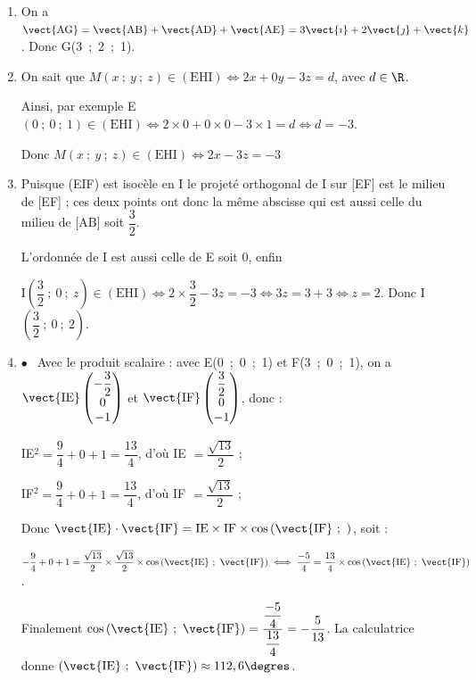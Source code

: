 \begin{enumerate}
\item 
On a $\vect{\text{AG}} = \vect{\text{AB}} + \vect{\text{AD}} + \vect{\text{AE}} = 3\vect{\imath} + 2\vect{\jmath} + \vect{k}$. Donc G(3~;~2~;~1).
\item 


On sait que $M(x~;~y~;~z) \in (\text{EHI}) \iff 2x + 0y - 3z = d$, avec $d \in \R$.

Ainsi, par exemple  E$(0~;~0~;~1) \in (\text{EHI}) \iff 2\times 0 + 0\times 0 - 3\times 1 = d \iff d = -3$.

Donc $M(x~;~y~;~z) \in (\text{EHI}) \iff 2x  - 3z = -3$
\item 
Puisque (EIF) est isocèle en I le projeté orthogonal de I sur [EF] est le milieu de [EF] ; ces deux points ont donc la même abscisse qui est aussi celle du milieu de [AB] soit $\dfrac32$.

L'ordonnée de I est aussi celle de E soit $0$, enfin 

I$\left(\dfrac32~;~0~;~z\right) \in (\text{EHI}) \iff 2 \times \dfrac32  - 3z = - 3\iff 3z = 3 + 3 \iff z = 2$. Donc I$\left(\dfrac32~;~0~;~2\right)$.
\item 
$\bullet~~$ Avec le produit scalaire : avec E(0~;~0~;~1) et F(3~;~0~;~1), on a $\vect{\text{IE}}\begin{pmatrix}-\dfrac32\\0\\- 1\end{pmatrix}$ et $\vect{\text{IF}}\begin{pmatrix}\dfrac32\\0\\- 1\end{pmatrix}$, donc :

IE$^2 = \dfrac94 + 0 + 1 = \dfrac{13}{4}$, d'où IE $ = \dfrac{\sqrt{13}}{2}$ ;

IF$^2 = \dfrac94 + 0 + 1 = \dfrac{13}{4}$, d'où IF $ = \dfrac{\sqrt{13}}{2}$ ;

Donc $\vect{\text{IE}} \cdot \vect{\text{IF}} = \text{IE} \times \text{IF} \times \cos \left(\vect{\text{IF}}~;~ \right)$, soit :

$- \dfrac94 + 0 + 1 = \dfrac{\sqrt{13}}{2} \times \dfrac{\sqrt{13}}{2} \times \cos \left(\vect{\text{IE}}~;~ \vect{\text{IF}}\right) \iff \dfrac{-5}{4} = \dfrac{13}{4}\times \cos \left(\vect{\text{IE}}~;~ \vect{\text{IF}}\right) $.

Finalement $\cos \left(\vect{\text{IE}}~;~ \vect{\text{IF}}\right) = \dfrac{\dfrac{-5}{4}}{\dfrac{13}{4}} = - \dfrac{5}{13}$. La calculatrice donne $\left(\vect{\text{IE}}~;~ \vect{\text{IF}}\right) \approx 112,6\degres$.


\end{enumerate}
